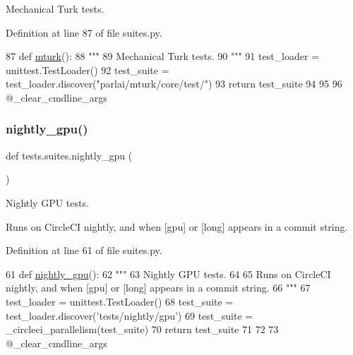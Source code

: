 \begin{DoxyVerb}Mechanical Turk tests.
\end{DoxyVerb}
 

Definition at line 87 of file suites.\+py.


\begin{DoxyCode}
87 \textcolor{keyword}{def }\hyperlink{namespacetests_1_1suites_a5d5a0bb14f72dd9c86a97cc6ca6add87}{mturk}():
88     \textcolor{stringliteral}{"""}
89 \textcolor{stringliteral}{    Mechanical Turk tests.}
90 \textcolor{stringliteral}{    """}
91     test\_loader = unittest.TestLoader()
92     test\_suite = test\_loader.discover(\textcolor{stringliteral}{"parlai/mturk/core/test/"})
93     \textcolor{keywordflow}{return} test\_suite
94 
95 
96 @\_clear\_cmdline\_args
\end{DoxyCode}
\mbox{\label{namespacetests_1_1suites_ab1df665f54fccb5bbceb95cf8e4498b9}} 
\subsubsection{\texorpdfstring{nightly\+\_\+gpu()}{nightly\_gpu()}}
{\footnotesize\ttfamily def tests.\+suites.\+nightly\+\_\+gpu (\begin{DoxyParamCaption}{ }\end{DoxyParamCaption})}

\begin{DoxyVerb}Nightly GPU tests.

Runs on CircleCI nightly, and when [gpu] or [long] appears in a commit string.
\end{DoxyVerb}
 

Definition at line 61 of file suites.\+py.


\begin{DoxyCode}
61 \textcolor{keyword}{def }\hyperlink{namespacetests_1_1suites_ab1df665f54fccb5bbceb95cf8e4498b9}{nightly\_gpu}():
62     \textcolor{stringliteral}{"""}
63 \textcolor{stringliteral}{    Nightly GPU tests.}
64 \textcolor{stringliteral}{}
65 \textcolor{stringliteral}{    Runs on CircleCI nightly, and when [gpu] or [long] appears in a commit string.}
66 \textcolor{stringliteral}{    """}
67     test\_loader = unittest.TestLoader()
68     test\_suite = test\_loader.discover(\textcolor{stringliteral}{'tests/nightly/gpu'})
69     test\_suite = \_circleci\_parallelism(test\_suite)
70     \textcolor{keywordflow}{return} test\_suite
71 
72 
73 @\_clear\_cmdline\_args
\end{DoxyCode}
\mbox{\label{namespacetests_1_1suites_a02a7d577493ceb024319292b96e13265}} 
